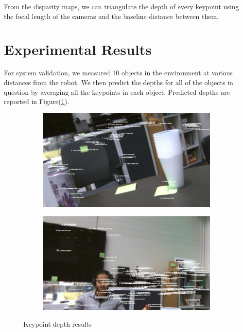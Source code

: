 \documentclass[12pt,letterpaper]{article}
\begin{document}
From the disparity maps, we can triangulate the depth of every keypoint using the focal length of the cameras and the baseline distance between them.

\section{Experimental Results}

For system validation, we measured 10 objects in the environment at various distances from the robot. We then predict the depths for all of the objects in question by averaging all the keypoints in each object. Predicted depths are reported in Figure(\ref{depth_results}).

\begin{figure}[htb]
	\centering
	\begin{subfigure}[c]{0.4\linewidth} 
		\includegraphics[width=\linewidth]{./images/depth_results_8.png}
		\subcaption{}
	\end{subfigure}
	\begin{subfigure}[c]{0.4\linewidth}
		\includegraphics[width=\linewidth]{./images/depth_results2_9.png}
		\subcaption{}
	\end{subfigure}
	\caption{Keypoint depth results}
	\label{depth_results}
\end{figure}
\end{document}
